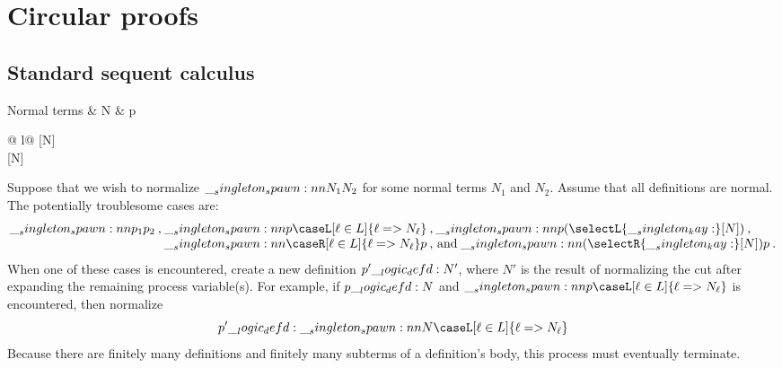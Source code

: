 

\section{Circular proofs}

\subsection{Standard sequent calculus}

\begin{syntax*}
  Normal terms & N &
    p \mid \fwd
    \begin{array}[t]{@{{} \mid {}}l@{}}
      \selectR{\kay}[N] \mid {} \\
       \mid \selectL{\kay}[N]
    \end{array}
\end{syntax*}

Suppose that we wish to normalize $\__singleton_spawn:nn {N_1} {N_2}$ for some normal terms $N_1$ and $N_2$.
Assume that all definitions are normal.
% 
% 
The potentially troublesome cases are:
\begin{equation*}
  \begin{lgathered}
    \spawn{p_1}{p_2} \:\text{,}\:
    \begin{array}[t]{@{}l@{}}
      \spawn{p}{\caseL[\ell \in L]{\ell => N_{\ell}}} \:\text{,}\:
      \spawn{p}{(\selectL{\kay}[N])} \:\text{,}\: \\
      \spawn{\caseR[\ell \in L]{\ell => N_{\ell}}}{p} \:\text{, and}\;
      \spawn{(\selectR{\kay}[N])}{p}
      \:.
    \end{array}
  \end{lgathered}
\end{equation*}
When one of these cases is encountered, create a new definition $p' \__logic_defd: N'$, where $N'$ is the result of normalizing the cut after expanding the remaining process variable(s).
For example, if $p \__logic_defd: N$ and $\spawn{p}{\caseL[\ell \in L]{\ell => N_{\ell}}}$ is encountered, then normalize
\begin{equation*}
  p' \defd \spawn{N}{\caseL[\ell \in L]{\ell => N_{\ell}}}
\end{equation*}
Because there are finitely many definitions and finitely many subterms of a definition's body, this process must eventually terminate.

